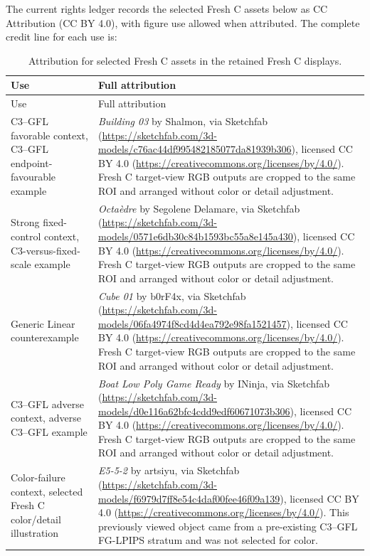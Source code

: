 \documentclass[11pt]{article}
\begin{document}
The current rights ledger records the selected Fresh C assets below as CC Attribution (CC BY 4.0), with figure use allowed when attributed. The complete credit line for each use is:
\begin{longtable}{p{4.3cm}p{10.9cm}}
\caption{Attribution for selected Fresh C assets in the retained Fresh C displays.}\label{tab:supp-credits}\\
\toprule Use & Full attribution \\
\midrule\endfirsthead
\toprule Use & Full attribution \\
\midrule\endhead
C3--GFL favorable context, C3--GFL endpoint-favourable example & \emph{Building 03} by Shalmon, via Sketchfab (\url{https://sketchfab.com/3d-models/c76ac44df995482185077da81939b306}), licensed CC BY 4.0 (\url{https://creativecommons.org/licenses/by/4.0/}). Fresh C target-view RGB outputs are cropped to the same ROI and arranged without color or detail adjustment. \\
Strong fixed-control context, C3-versus-fixed-scale example & \emph{Octaèdre} by Segolene Delamare, via Sketchfab (\url{https://sketchfab.com/3d-models/0571e6db30c84b1593bc55a8e145a430}), licensed CC BY 4.0 (\url{https://creativecommons.org/licenses/by/4.0/}). Fresh C target-view RGB outputs are cropped to the same ROI and arranged without color or detail adjustment. \\
Generic Linear counterexample & \emph{Cube 01} by b0rF4x, via Sketchfab (\url{https://sketchfab.com/3d-models/06fa4974f8cd4d4ea792e98fa1521457}), licensed CC BY 4.0 (\url{https://creativecommons.org/licenses/by/4.0/}). Fresh C target-view RGB outputs are cropped to the same ROI and arranged without color or detail adjustment. \\
C3--GFL adverse context, adverse C3--GFL example & \emph{Boat Low Poly Game Ready} by INinja, via Sketchfab (\url{https://sketchfab.com/3d-models/d0e116a62bfc4cdd9edf60671073b306}), licensed CC BY 4.0 (\url{https://creativecommons.org/licenses/by/4.0/}). Fresh C target-view RGB outputs are cropped to the same ROI and arranged without color or detail adjustment. \\
Color-failure context, selected Fresh C color/detail illustration & \emph{E5-5-2} by artsiyu, via Sketchfab (\url{https://sketchfab.com/3d-models/f6979d7ff8e54c4daf00fee46f09a139}), licensed CC BY 4.0 (\url{https://creativecommons.org/licenses/by/4.0/}). This previously viewed object came from a pre-existing C3--GFL FG-LPIPS stratum and was not selected for color. \\
\bottomrule
\end{longtable}
\end{document}
